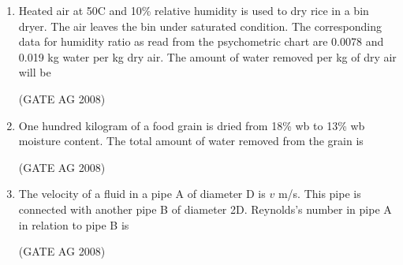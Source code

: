 \documentclass[journal,12pt,onecolumn]{IEEEtran}
\begin{document}
\begin{enumerate}
\medskip

\item 
 Heated air at 50\textdegree C and 10\% relative humidity is used to dry rice in a bin dryer. The air leaves the bin under saturated condition. The corresponding data for humidity ratio as read from the psychometric chart are 0.0078 and 0.019 kg water per kg dry air. The amount of water removed per kg of dry air will be
\begin{enumerate}
\end{enumerate}
\hfill(GATE AG 2008)\\

\medskip

\item 
 One hundred kilogram of a food grain is dried from 18\% wb to 13\% wb moisture content. The total amount of water removed from the grain is
\begin{enumerate}
\end{enumerate}
\hfill(GATE AG 2008)\\

\medskip

\item 
 The velocity of a fluid in a pipe A of diameter D is $v$ m/s. This pipe is connected with another pipe B of diameter 2D. Reynolds's number in pipe A in relation to pipe B is
\begin{enumerate}
\end{enumerate}
\hfill(GATE AG 2008)\\


\end{enumerate}
\end{document}
